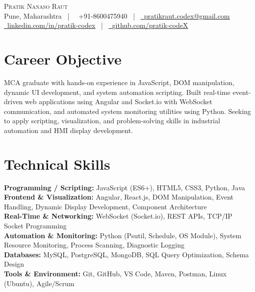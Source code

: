 \documentclass[letterpaper,11pt]{article}
\newcommand{\faPhone}{}
\newcommand{\faEnvelope}{}
\newcommand{\faLinkedin}{}
\newcommand{\faGithub}{}
\begin{document}
\begin{center}
    {\Huge \scshape Pratik Nanaso Raut} \\ \vspace{3pt}
    \small Pune, Maharashtra ~|~
    \faPhone\ +91-8600475940 ~|~
    \href{mailto:pratikraut.codex@gmail.com}{\faEnvelope\ \underline{pratikraut.codex@gmail.com}} \\ \vspace{3pt}
    \href{https://linkedin.com/in/pratik-codex}{\faLinkedin\ \underline{linkedin.com/in/pratik-codex}} ~|~
    \href{https://github.com/pratik-codeX}{\faGithub\ \underline{github.com/pratik-codeX}}
\end{center}

\vspace{-2pt}

\section{Career Objective}
MCA graduate with hands-on experience in JavaScript, DOM manipulation, dynamic UI development, and system automation scripting. Built real-time event-driven web applications using Angular and Socket.io with WebSocket communication, and automated system monitoring utilities using Python. Seeking to apply scripting, visualization, and problem-solving skills in industrial automation and HMI display development.

\section{Technical Skills}
\vspace{2pt}
\textbf{Programming / Scripting:} JavaScript (ES6+), HTML5, CSS3, Python, Java \\[2pt]
\textbf{Frontend \& Visualization:} Angular, React.js, DOM Manipulation, Event Handling, Dynamic Display Development, Component Architecture \\[2pt]
\textbf{Real-Time \& Networking:} WebSocket (Socket.io), REST APIs, TCP/IP Socket Programming \\[2pt]
\textbf{Automation \& Monitoring:} Python (Psutil, Schedule, OS Module), System Resource Monitoring, Process Scanning, Diagnostic Logging \\[2pt]
\textbf{Databases:} MySQL, PostgreSQL, MongoDB, SQL Query Optimization, Schema Design \\[2pt]
\textbf{Tools \& Environment:} Git, GitHub, VS Code, Maven, Postman, Linux (Ubuntu), Agile/Scrum
\end{document}
